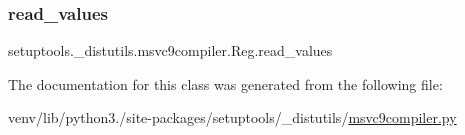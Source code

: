 \subsubsection{\texorpdfstring{read\+\_\+values}{read\_values}}
{\footnotesize\ttfamily setuptools.\+\_\+distutils.\+msvc9compiler.\+Reg.\+read\+\_\+values\hspace{0.3cm}{\ttfamily [static]}}



The documentation for this class was generated from the following file\+:\begin{DoxyCompactItemize}
\item 
venv/lib/python3./site-\/packages/setuptools/\+\_\+distutils/\hyperlink{setuptools_2__distutils_2msvc9compiler_8py}{msvc9compiler.\+py}\end{DoxyCompactItemize}
